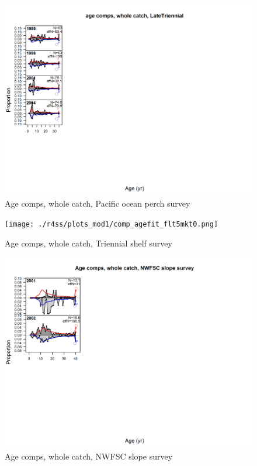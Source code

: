 \documentclass[12pt,]{article}
\begin{document}
\begin{figure}
\centering
\includegraphics{./r4ss/plots_mod1/comp_agefit_flt4mkt0.png}
\caption{Age comps, whole catch, Pacific ocean perch survey
\label{fig:age_fits}}
\end{figure}

\begin{figure}
\centering
\texttt{[image: ./r4ss/plots\_mod1/comp\_agefit\_flt5mkt0.png]}
\caption{Age comps, whole catch, Triennial shelf survey
\label{fig:age_fits}}
\end{figure}

\begin{figure}
\centering
\includegraphics{./r4ss/plots_mod1/comp_agefit_flt7mkt0.png}
\caption{Age comps, whole catch, NWFSC slope survey
\label{fig:age_fits}}
\end{figure}
\end{document}
